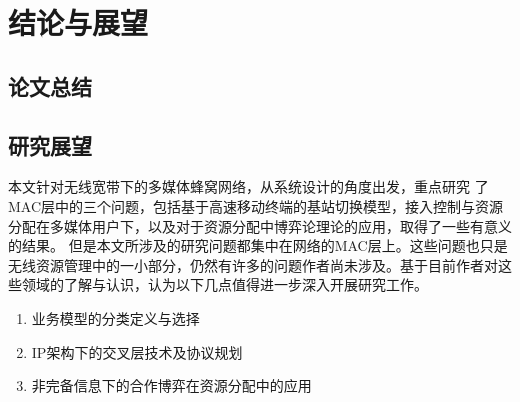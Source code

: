 \chapter{结论与展望}
\label{chap_conclusions}
\section{论文总结}
\section{研究展望}
本文针对无线宽带下的多媒体蜂窝网络，从系统设计的角度出发，重点研究
了MAC层中的三个问题，包括基于高速移动终端的基站切换模型，接入控制与资源分配在多媒体用户下，以及对于资源分配中博弈论理论的应用，取得了一些有意义的结果。
但是本文所涉及的研究问题都集中在网络的MAC层上。这些问题也只是无线资源管理中的一小部分，仍然有许多的问题作者尚未涉及。基于目前作者对这些领域的了解与认识，认为以下几点值得进一步深入开展研究工作。
\begin{enumerate}[(1)]
\item 业务模型的分类定义与选择
\item IP架构下的交叉层技术及协议规划
\item 非完备信息下的合作博弈在资源分配中的应用
\end{enumerate}

